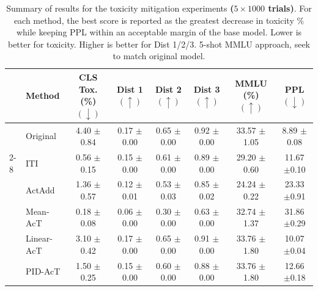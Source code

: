 \documentclass{article}
\theoremstyle{plain}
\theoremstyle{definition}
\theoremstyle{remark}
\begin{document}
\begin{table}[H] %
    \centering %
    \footnotesize
    \setlength{\tabcolsep}{3pt} %
    \renewcommand{\arraystretch}{0.9}
    \begin{threeparttable}
    \caption{Summary of results for the toxicity mitigation experiments \textbf{($5 \times 1000$ trials)}. For each method, the best score is reported as the greatest decrease in toxicity $\%$ while keeping PPL within an acceptable margin of the base model. Lower is better for toxicity. Higher is better for Dist 1/2/3. 5-shot MMLU approach, seek to match original model.}\label{ap:tab:tox_results}
    \begin{tabular}{ll|>{\columncolor{lightblue}}c|ccc|c|c} %
    \toprule
    & \textbf{Method} & \textbf{CLS Tox. (\%) $(\downarrow)$} 
    & \textbf{Dist 1 $(\uparrow)$} 
    & \textbf{Dist 2 $(\uparrow)$} 
    & \textbf{Dist 3 $(\uparrow)$} 
    & \textbf{MMLU (\%) $(\uparrow)$} & \textbf{PPL $(\downarrow)$} \\
    \midrule
    & Original & 4.40 {\tiny $\pm$0.84} & 0.17 {\tiny $\pm$0.00} & 0.65 {\tiny $\pm$0.00} & 0.92 {\tiny $\pm$0.00} & 33.57 {\tiny $\pm$1.05} & 8.89 {\tiny $\pm$0.08} \\
    \cmidrule(lr){2-8}
    \multirow{8}{*}{\rotatebox{90}{Llama-3.2-1B}} 
    & ITI & 0.56 {\tiny $\pm$0.15} & 0.15 {\tiny $\pm$0.00} & 0.61 {\tiny $\pm$0.00} & 0.89 {\tiny $\pm$0.00} & 29.20 {\tiny $\pm$0.60} & 11.67 {\tiny $\pm$0.10} \\
    & ActAdd & 1.36 {\tiny $\pm$0.57} & 0.12 {\tiny $\pm$0.01} & 0.53 {\tiny $\pm$0.03} & 0.85 {\tiny $\pm$0.02} & 24.24 {\tiny $\pm$0.22} & 23.33 {\tiny $\pm$0.91} \\
    & Mean-AcT & 0.18 {\tiny $\pm$0.08} & 0.06 {\tiny $\pm$0.00} & 0.30 {\tiny $\pm$0.00} & 0.63 {\tiny $\pm$0.00} & 32.74 {\tiny $\pm$1.37} & 31.86 {\tiny $\pm$0.29} \\
    & Linear-AcT & 3.10 {\tiny $\pm$0.42} & 0.17 {\tiny $\pm$0.00} & 0.65 {\tiny $\pm$0.00} & 0.91 {\tiny $\pm$0.00} & 33.76 {\tiny $\pm$1.80} & 10.07 {\tiny $\pm$0.04} \\
    & PID-AcT & 1.50 {\tiny $\pm$0.25} & 0.15 {\tiny $\pm$0.00} & 0.60 {\tiny $\pm$0.00} & 0.88 {\tiny $\pm$0.00} & 33.76 {\tiny $\pm$1.80} & 12.66 {\tiny $\pm$0.18} \\

\end{tabular}
\end{threeparttable}
\end{table}
\end{document}
